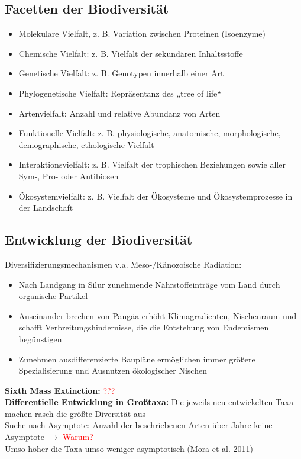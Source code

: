\subsection{Facetten der Biodiversität}
\begin{itemize}
	\item Molekulare Vielfalt, z. B. Variation zwischen Proteinen (Isoenzyme)
	\item Chemische Vielfalt: z. B. Vielfalt der sekundären Inhaltsstoffe
	\item Genetische Vielfalt: z. B. Genotypen innerhalb einer Art
	\item Phylogenetische Vielfalt: Repräsentanz des „tree of life“
	\item Artenvielfalt: Anzahl und relative Abundanz von Arten
	\item Funktionelle Vielfalt: z. B. physiologische, anatomische, morphologische, demographische, ethologische Vielfalt
	\item Interaktionsvielfalt: z. B. Vielfalt der trophischen Beziehungen sowie aller Sym-, Pro- oder Antibiosen
	\item Ökosystemvielfalt: z. B. Vielfalt der Ökosysteme und Ökosystemprozesse in der Landschaft
\end{itemize}

\subsection{Entwicklung der Biodiversität}
Diversifizierungsmechanismen v.a. Meso-/Känozoische Radiation:
\begin{itemize}
	\item Nach Landgang in Silur zunehmende Nährstoffeinträge vom Land durch organische Partikel
	\item Auseinander brechen von Pangäa erhöht Klimagradienten, Nischenraum und schafft Verbreitungshindernisse, die die Entstehung von Endemismen begünstigen
	\item Zunehmen ausdifferenzierte Baupläne ermöglichen immer größere Spezialisierung und Ausnutzen ökologischer Nischen
\end{itemize}

\textbf{Sixth Mass Extinction:} \textcolor{red}{???}
\\

\textbf{Differentielle Entwicklung in Großtaxa:} Die jeweils neu entwickelten Taxa machen rasch die größte Diversität aus\\
Suche nach Asymptote: Anzahl der beschriebenen Arten über Jahre keine Asymptote $\rightarrow$ \textcolor{red}{Warum?}\\
Umso höher die Taxa umso weniger asymptotisch (Mora et al. 2011)\\

